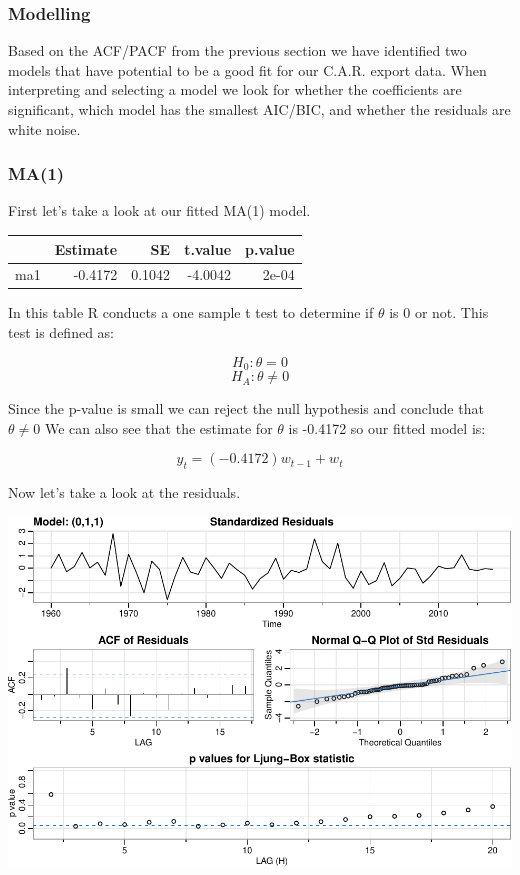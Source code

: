 \documentclass[
]{article}
\begin{document}
\hypertarget{modelling}{%
\subsubsection{Modelling}\label{modelling}}

Based on the ACF/PACF from the previous section we have identified two
models that have potential to be a good fit for our C.A.R. export data.
When interpreting and selecting a model we look for whether the
coefficients are significant, which model has the smallest AIC/BIC, and
whether the residuals are white noise.

\hypertarget{ma1}{%
\subsubsection{MA(1)}\label{ma1}}

First let's take a look at our fitted MA(1) model.

\begin{center}

\begin{tabular}{l|r|r|r|r}
\hline
  & Estimate & SE & t.value & p.value\\
\hline
ma1 & -0.4172 & 0.1042 & -4.0042 & 2e-04\\
\hline
\end{tabular}
\end{center}

In this table R conducts a one sample t test to determine if \(\theta\)
is 0 or not. This test is defined as:

\[H_0: \theta = 0  \] \[H_A: \theta \neq 0  \]

Since the p-value is small we can reject the null hypothesis and
conclude that \(\theta \neq 0\) We can also see that the estimate for
\(\theta\) is -0.4172 so our fitted model is:

\[y_t = (-0.4172) w_{t-1} + w_t\]

Now let's take a look at the residuals.

\includegraphics{STA_137_Final_Project_files/figure-latex/unnamed-chunk-8-1.pdf}
\end{document}
